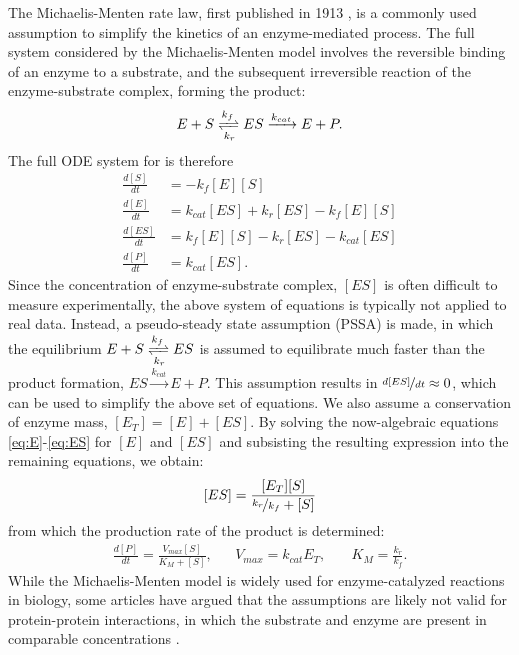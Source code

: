 The Michaelis-Menten rate law, first published in 1913 \cite{Johnson2011}, is a commonly used assumption to simplify the kinetics of an enzyme-mediated process.
The full system considered by the Michaelis-Menten model involves the reversible binding of an enzyme to a substrate, and the subsequent irreversible reaction of the enzyme-substrate complex, forming the product:
\begin{equation}
  E + S \xrightleftharpoons[k_r]{k_f} ES \xrightarrow{k_{cat}} E + P.
  \label{eq:mmreactions}
\end{equation}
The full ODE system for  is therefore
\begin{align}
  \frac{d[S]}{dt} &=  -k_f[E][S] \label{eq:S}\\
  \frac{d[E]}{dt} &= k_{cat}[ES] + k_r[ES] - k_f[E][S] \label{eq:E}\\
  \frac{d[ES]}{dt} &= k_f[E][S] - k_r[ES] - k_{cat}[ES] \label{eq:ES}\\
  \frac{d[P]}{dt} &= k_{cat}[ES]. \label{eq:P}
\end{align}
Since the concentration of enzyme-substrate complex, $[ES]$ is often difficult to measure experimentally, the above system of equations is typically not applied to real data.
Instead, a pseudo-steady state assumption (PSSA) is made, in which the equilibrium $E + S \xrightleftharpoons[k_r]{k_f} ES$ is assumed to equilibrate much faster than the product formation, $ES \xrightarrow{k_{cat}} E + P$.
This assumption results in $\nicefrac{d[ES]}{dt} \approx 0$, which can be used to simplify the above set of equations. We also assume a conservation of enzyme mass, $[E_T] = [E] + [ES]$. By solving the now-algebraic equations \ref{eq:E}-\ref{eq:ES} for $[E]$ and $[ES]$ and subsisting the resulting expression into the remaining equations, we obtain:
\[
  [ES] = \frac{[E_T][S]}{\nicefrac{k_r}{k_f} + [S]}
\]
from which the production rate of the product is determined:
\begin{align*}
  \frac{d[P]}{dt} = \frac{V_{max}[S]}{K_M + [S]}, & & V_{max} = k_{cat}E_T, & \quad K_M = \frac{k_r}{k_f}.
\end{align*}
While the Michaelis-Menten model is widely used for enzyme-catalyzed reactions in biology, some articles have argued that the assumptions are likely not valid for protein-protein interactions, in which the substrate and enzyme are present in comparable concentrations \cite{Tzafriri2004}.

